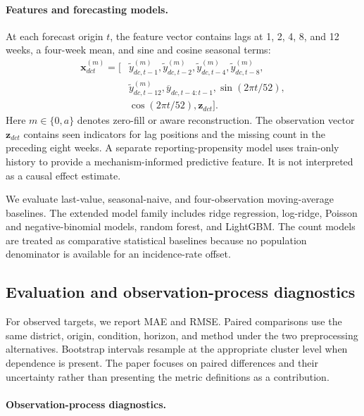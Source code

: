 \documentclass[runningheads]{llncs}
\begin{document}
\paragraph{Features and forecasting models.}

At each forecast origin $t$, the feature vector contains lags at 1, 2, 4, 8, and 12 weeks, a four-week mean, and sine and cosine seasonal terms:
\begin{equation}
\begin{aligned}
\mathbf{x}_{dct}^{(m)}=[&\tilde{y}^{(m)}_{dc,t-1},\tilde{y}^{(m)}_{dc,t-2},\tilde{y}^{(m)}_{dc,t-4},\tilde{y}^{(m)}_{dc,t-8},\\
&\tilde{y}^{(m)}_{dc,t-12},\overline{y}_{dc,t-4:t-1},\sin(2\pi t/52),\\
&\cos(2\pi t/52),\mathbf{z}_{dct}].
\end{aligned}
\end{equation}
Here $m\in\{0,a\}$ denotes zero-fill or aware reconstruction. The observation vector $\mathbf{z}_{dct}$ contains seen indicators for lag positions and the missing count in the preceding eight weeks. A separate reporting-propensity model uses train-only history to provide a mechanism-informed predictive feature. It is not interpreted as a causal effect estimate.

We evaluate last-value, seasonal-naive, and four-observation moving-average baselines. The extended model family includes ridge regression, log-ridge, Poisson and negative-binomial models, random forest, and LightGBM. The count models are treated as comparative statistical baselines because no population denominator is available for an incidence-rate offset.

\subsection{Evaluation and observation-process diagnostics}

For observed targets, we report MAE and RMSE. Paired comparisons use the same district, origin, condition, horizon, and method under the two preprocessing alternatives. Bootstrap intervals resample at the appropriate cluster level when dependence is present. The paper focuses on paired differences and their uncertainty rather than presenting the metric definitions as a contribution.

\paragraph{Observation-process diagnostics.}
\end{document}
